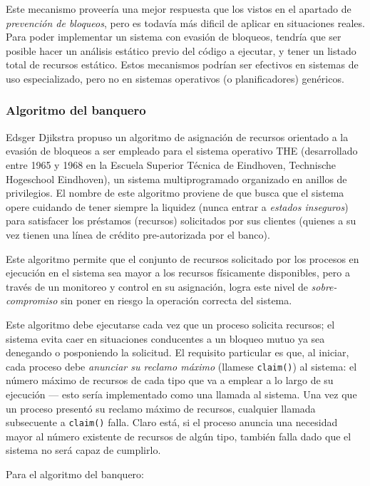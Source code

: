 \documentclass[11pt,fleqn]{book} %
\begin{document}
Este mecanismo proveería una mejor respuesta que los vistos en el
apartado de \emph{prevención de bloqueos}, pero es todavía más dificil de
aplicar en situaciones reales. Para poder implementar un sistema con
evasión de bloqueos, tendría que ser posible hacer un análisis
estático previo del código a ejecutar, y tener un listado total de
recursos estático. Estos mecanismos podrían ser efectivos en sistemas
de uso especializado, pero no en sistemas operativos (o
planificadores) genéricos.
\subsubsection{Algoritmo del banquero}
\label{sec-3-4-2-1}


Edsger Djikstra propuso un algoritmo de asignación de recursos
orientado a la evasión de bloqueos a ser empleado para el sistema
operativo THE (desarrollado entre 1965 y 1968 en la Escuela Superior
Técnica de Eindhoven, Technische Hogeschool Eindhoven), un sistema
multiprogramado organizado en anillos de privilegios. El nombre de
este algoritmo proviene de que busca que el sistema opere cuidando de
tener siempre la liquidez (nunca entrar a \emph{estados inseguros}) para
satisfacer los préstamos (recursos) solicitados por sus clientes
(quienes a su vez tienen una línea de crédito pre-autorizada por el
banco).

Este algoritmo permite que el conjunto de recursos solicitado por los
procesos en ejecución en el sistema sea mayor a los recursos
físicamente disponibles, pero a través de un monitoreo y control en su
asignación, logra este nivel de \emph{sobre-compromiso} sin poner en riesgo
la operación correcta del sistema.

Este algoritmo debe ejecutarse cada vez que un proceso solicita
recursos; el sistema evita caer en situaciones conducentes a un
bloqueo mutuo ya sea denegando o posponiendo la solicitud. El
requisito particular es que, al iniciar, cada proceso debe \emph{anunciar su reclamo máximo} (llamese \texttt{claim()}) al sistema: el número máximo
de recursos de cada tipo que va a emplear a lo largo de su ejecución —
esto sería implementado como una llamada al sistema. Una vez que un
proceso presentó su reclamo máximo de recursos, cualquier llamada
subsecuente a \texttt{claim()} falla. Claro está, si el proceso anuncia una
necesidad mayor al número existente de recursos de algún tipo, también
falla dado que el sistema no será capaz de cumplirlo.

Para el algoritmo del banquero:
\end{document}
